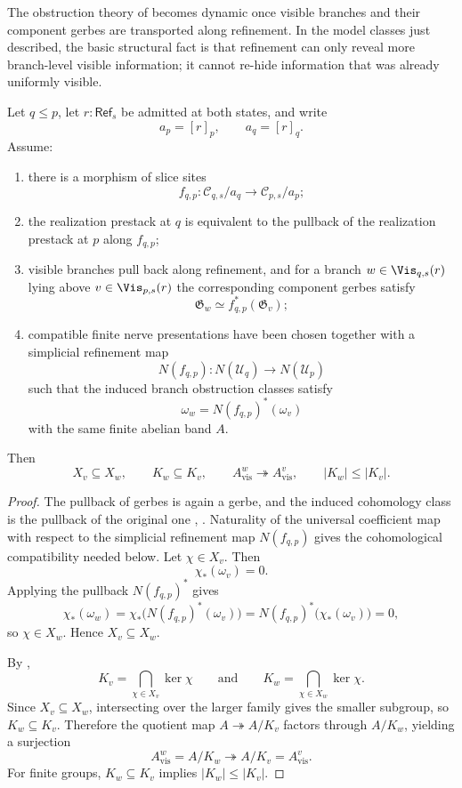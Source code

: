 The obstruction theory of  becomes dynamic once visible branches and their component gerbes are transported along refinement. In the model classes just described, the basic structural fact is that refinement can only reveal more branch-level visible information; it cannot re-hide information that was already uniformly visible.

\begin{proposition}\label{thm:branch-visibility-monotonicity}
Let $q\le p$, let $r:\mathsf{Ref}_s$ be admitted at both states, and write
\[
a_p=[r]_p,
\qquad
a_q=[r]_q.
\]
Assume:
\begin{enumerate}[label=(\roman*),nosep]
\item there is a morphism of slice sites
\[
f_{q,p}:\mathcal C_{q,s}/a_q\to \mathcal C_{p,s}/a_p;
\]
\item the realization prestack at $q$ is equivalent to the pullback of the realization prestack at $p$ along $f_{q,p}$;
\item visible branches pull back along refinement, and for a branch $w\in \Vis_{q,s}(r)$ lying above $v\in \Vis_{p,s}(r)$ the corresponding component gerbes satisfy
\[
\mathfrak G_w\simeq f_{q,p}^*(\mathfrak G_v);
\]
\item compatible finite nerve presentations have been chosen together with a simplicial refinement map
\[
N(f_{q,p}):N(\mathcal U_q)\to N(\mathcal U_p)
\]
such that the induced branch obstruction classes satisfy
\[
\omega_w=N(f_{q,p})^*(\omega_v)
\]
with the same finite abelian band $A$.
\end{enumerate}
Then
\[
X_v\subseteq X_w,
\qquad
K_w\subseteq K_v,
\qquad
A_{\mathrm{vis}}^w\twoheadrightarrow A_{\mathrm{vis}}^v,
\qquad
|K_w|\le |K_v|.
\]
\end{proposition}

\begin{proof}
The pullback of gerbes is again a gerbe, and the induced cohomology class is the pullback of the original one \cite[Tag 06NY]{StacksProject}, \cite[Theorem~3.11]{BerghSchnurer2021}. Naturality of the universal coefficient map with respect to the simplicial refinement map $N(f_{q,p})$ gives the cohomological compatibility needed below. Let $\chi\in X_v$. Then
\[
\chi_*(\omega_v)=0.
\]
Applying the pullback $N(f_{q,p})^*$ gives
\[
\chi_*(\omega_w)=\chi_*\bigl(N(f_{q,p})^*(\omega_v)\bigr)=N(f_{q,p})^*\bigl(\chi_*(\omega_v)\bigr)=0,
\]
so $\chi\in X_w$. Hence $X_v\subseteq X_w$.

By ,
\[
K_v=\bigcap_{\chi\in X_v}\ker\chi
\qquad\text{and}\qquad
K_w=\bigcap_{\chi\in X_w}\ker\chi.
\]
Since $X_v\subseteq X_w$, intersecting over the larger family gives the smaller subgroup, so $K_w\subseteq K_v$. Therefore the quotient map $A\twoheadrightarrow A/K_v$ factors through $A/K_w$, yielding a surjection
\[
A_{\mathrm{vis}}^w=A/K_w\twoheadrightarrow A/K_v=A_{\mathrm{vis}}^v.
\]
For finite groups, $K_w\subseteq K_v$ implies $|K_w|\le |K_v|$.
\end{proof}

